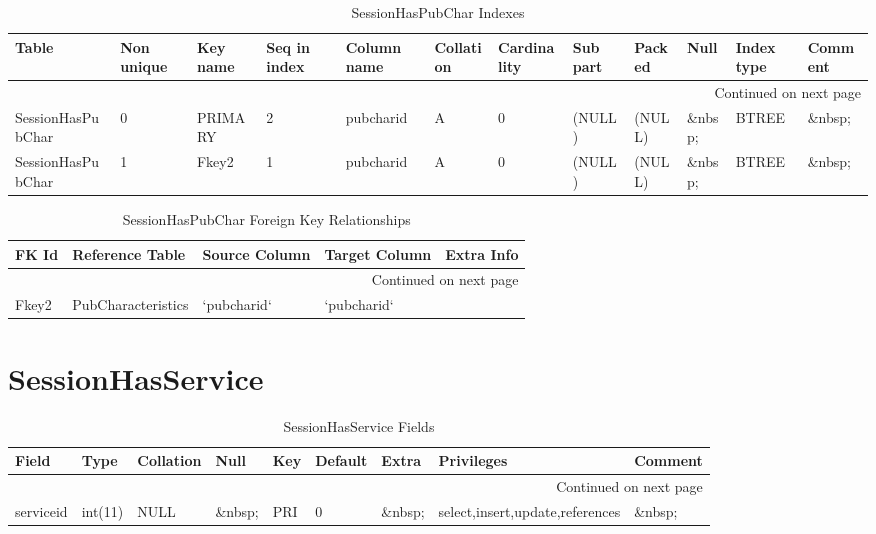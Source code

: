 \documentclass[tablesignature]{scrartcl}
\begin{document}
\begin{longtable}{|l|l|l|l|l|l|l|l|l|l|l|l|}
\caption{SessionHasPubChar Indexes} \label{tbl:sessionhaspubcharindexes}\\
\hline
 Table              &  Non unique  &  Key name  &  Seq in index  &  Column name  &  Collation  &  Cardinality  &  Sub part  &  Packed  &  Null     &  Index type  &  Comment \\
\hline
\endhead
\hline\multicolumn{12}{r}{Continued on next page}\
\endfoot
\endlastfoot
\hline
 SessionHasPubChar  &           0  &  PRIMARY   &             1  &  sessionid    &  A          &            0  &  (NULL)    &  (NULL)  &  \&nbsp;  &  BTREE       &  \&nbsp;  \\
 SessionHasPubChar  &           0  &  PRIMARY   &             2  &  pubcharid    &  A          &            0  &  (NULL)    &  (NULL)  &  \&nbsp;  &  BTREE       &  \&nbsp;  \\
 SessionHasPubChar  &           1  &  Fkey2     &             1  &  pubcharid    &  A          &            0  &  (NULL)    &  (NULL)  &  \&nbsp;  &  BTREE       &  \&nbsp;  \\
\hline
\end{longtable}


\begin{longtable}{|l|l|l|l|l|}
\caption{SessionHasPubChar Foreign Key Relationships} \label{tbl:sessionhaspubcharfkr}\\
\hline
 FK Id  &  Reference Table     &  Source Column  &  Target Column  &  Extra Info \\
\hline
\endhead
\hline\multicolumn{5}{r}{Continued on next page}\
\endfoot
\endlastfoot
\hline
 Fkey1  &  Sessions            &  `sessionid`    &  `sessionid`    &              \\
 Fkey2  &  PubCharacteristics  &  `pubcharid`    &  `pubcharid`    &              \\
\hline
\end{longtable}
\section{SessionHasService}
\label{sec-28}


\begin{longtable}{|l|l|l|l|l|l|l|l|l|}
\caption{SessionHasService Fields} \label{tbl:sessionhasservicefields}\\
\hline
 Field      &  Type     &  Collation  &  Null     &  Key  &  Default  &  Extra    &  Privileges                       &  Comment \\
\hline
\endhead
\hline\multicolumn{9}{r}{Continued on next page}\
\endfoot
\endlastfoot
\hline
 sessionid  &  int(11)  &  NULL       &  \&nbsp;  &  PRI  &        0  &  \&nbsp;  &  select,insert,update,references  &  \&nbsp;  \\
 serviceid  &  int(11)  &  NULL       &  \&nbsp;  &  PRI  &        0  &  \&nbsp;  &  select,insert,update,references  &  \&nbsp;  \\
\hline
\end{longtable}
\end{document}
